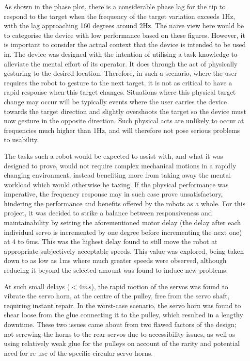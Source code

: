 \documentclass[11pt]{article}
\begin{document}
As shown in the phase plot, there is a considerable phase lag for the tip to respond to the target when the frequency of the target variation exceeds 1Hz, with the lag approaching 160 degrees around 2Hz. The naive view here would be to categorise the device with low performance based on these figures. However, it is important to consider the actual context that the device is intended to be used in. The device was designed with the intention of utilising a task knowledge to alleviate the mental effort of its operator. It does through the act of physically gesturing to the desired location. Therefore, in such a scenario, where the user requires the robot to gesture to the next target, it is not as critical to have a rapid response when this target changes. Situations where this physical target change may occur will be typically events where the user carries the device towards the target direction and slightly overshoots the target so the device must now gesture in the opposite direction. Such physical acts are unlikely to occur at frequencies much higher than 1Hz, and will therefore not pose serious problems to usability. 

The tasks such a robot would be expected to assist with, and what it was designed to prove, would not require complex mechanical motions in a rapidly changing environment, instead benefiting more from taking away the mental workload which would otherwise be taxing. If the physical performance was imperative, the frequency response may in such case prove unsatisfactory, hindering the performance and benefits offered by the robots as a whole. For this project, it was decided to strike a balance between responsiveness and maintainability by setting the aforementioned motor delay (the delay after each individual servo is incremented by one degree before incrementing the next one) at 4 to 6ms. This was the highest delay found to still move the robot at appropriate subjectively acceptable speeds. This value was explored, being taken down to as low as 1ms where much greater speeds were observed, although reducing it beyond the selected amount was found to induce new problems. 

At such small delays ($<4ms$), the rapid motion of the servos was found to vibrate the servo horn, at the centre of the pulley, free from the servo shaft, requiring instant repair. In the worst-case scenario, the servo horn was found to shear loose from the glue connecting it to the pulley, which resulted in a lengthy downtime. These two issues came about from two flawed factors of the design; not screwing the horns to the rear servos due to accessibility issues, as well as using relatively weak glue for the pulleys on account of the rarity and potential need for re-use of the specific circular servo horns.  
\end{document}
